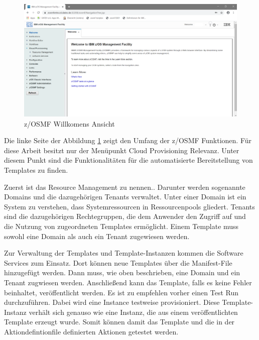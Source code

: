 \begin{figure}[h]
\centering
\includegraphics[width=\textwidth]{figures/zosmf.png}
\caption{z/OSMF Willkomens Ansicht}
\label{fig:zosmf_welcome}
\end{figure}

Die linke Seite der Abbildung \ref{fig:zosmf_welcome} zeigt den Umfang der z/OSMF  Funktionen.
Für diese Arbeit besitzt nur der Menüpunkt \glqq Cloud Provisioning\grqq{} Relevanz.
Unter diesem Punkt sind die Funktionalitäten für die automatisierte Bereitstellung von Templates zu finden.
\cite{Rotthove.2018}

Zuerst ist das \glqq Resource Management\grqq{} zu nennen..
Darunter werden sogenannte \glqq Domains\grqq{} und die dazugehörigen \glqq Tenants\grqq{} verwaltet.
Unter einer \glqq Domain\grqq{} ist ein System zu verstehen, dass Systemressourcen in Ressourcenpools gliedert.
\glqq Tenants\grqq{} sind die dazugehörigen Rechtegruppen, die dem Anwender den Zugriff auf und die Nutzung von zugeordneten Templates ermöglicht.
Einem Template muss sowohl eine \glqq Domain\grqq{} als auch ein \glqq Tenant\grqq{} zugewiesen werden.
\cite{Rotthove.2018}

Zur Verwaltung der Templates und Template-Instanzen kommen die \glqq Software Services\grqq{} zum Einsatz.
Dort können neue Templates über die Manifest-File hinzugefügt werden.
Dann muss, wie oben beschrieben, eine \glqq Domain\grqq{} und ein \glqq Tenant\grqq{} zugwiesen werden.
Anschließend kann das Template, falls es keine Fehler beinhaltet, veröffentlicht werden.
Es ist zu empfehlen vorher einen \glqq Test Run\grqq{} durchzuführen.
Dabei wird eine Instance testweise provisioniert.
Diese Template-Instanz verhält sich genauso wie eine Instanz, die aus einem veröffentlichten Template erzeugt wurde.
Somit können damit das Template und die in der Aktiondefintionfile definierten Aktionen getestet werden.
\cite{Rotthove.2018}
